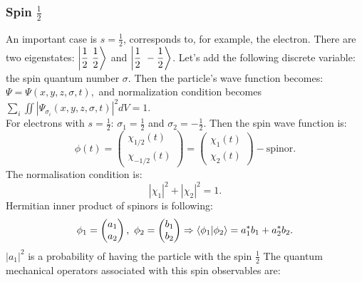 \documentclass[a4paper, 14pt]{article}
\begin{document}
\subsubsection{Spin $\frac{1}{2}$}
An important case is $s = \frac{1}{2}$, corresponds to, for example,  the electron. There are two eigenstates: $\displaystyle{\ket{\frac{1}{2} ~ \frac{1}{2}}}$ and $\displaystyle{\ket{\frac{1}{2} ~ -\frac{1}{2}}}
$. %
Let's add the following discrete variable: the spin quantum number $\sigma.$ Then the particle's wave function becomes:
$\Psi = \Psi(x,y,z, \sigma, t), $ and normalization condition becomes $\displaystyle{\sum_i \iint |\Psi_{\sigma_i} (x,y,z, \sigma, t)|^2dV=1}.$ \\
For electrons with $s = \frac{1}{2}$: $\sigma_1 = \frac{1}{2}$ and $\sigma_2 = -\frac{1}{2}$. Then  the spin wave function is:
$$\displaystyle{\phi(t) = 
\begin{pmatrix}
	\chi_{1/2}(t) \\
	\chi_{-1/2}(t)
\end{pmatrix} = 
\begin{pmatrix}
	\chi_1 (t) \\
	\chi_2(t)
\end{pmatrix}} - \text{spinor}.$$
The normalisation condition is:
$$|\chi_1| ^2 + |\chi_2|^2 =1.$$
Hermitian inner product of spinors is following:
$$\phi_1 = \begin{pmatrix}
	a_1 \\
	a_2
\end{pmatrix}, ~ \phi_2 = \begin{pmatrix}
	b_1 \\
	b_2
\end{pmatrix} \Rightarrow \bra{\phi_1}\ket{\phi_2} = a_1^* b_1 + a_2^* b_2.$$
$|a_1|^2$ is a probability of having the particle with the spin  $\frac{1}{2}$
The quantum mechanical operators associated with this spin observables are:
\end{document}
